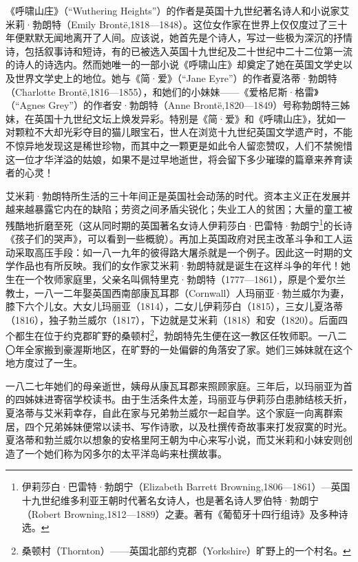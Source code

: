 \par 《呼啸山庄》（“Wuthering Heights”）的作者是英国十九世纪著名诗人和小说家艾米莉·勃朗特（Emily Brontë,1818—1848）。这位女作家在世界上仅仅度过了三十年便默默无闻地离开了人间。应该说，她首先是个诗人，写过一些极为深沉的抒情诗，包括叙事诗和短诗，有的已被选入英国十九世纪及二十世纪中二十二位第一流的诗人的诗选内。然而她唯一的一部小说《呼啸山庄》却奠定了她在英国文学史以及世界文学史上的地位。她与《简·爱》（“Jane Eyre”）的作者夏洛蒂·勃朗特（Charlotte Brontë,1816—1855），和她们的小妹妹——《爱格尼斯·格雷》（“Agnes Grey”）的作者安·勃朗特（Anne Brontë,1820—1849）号称勃朗特三姊妹，在英国十九世纪文坛上焕发异彩。特别是《简·爱》和《呼啸山庄》，犹如一对颗粒不大却光彩夺目的猫儿眼宝石，世人在浏览十九世纪英国文学遗产时，不能不惊异地发现这是稀世珍物，而其中之一颗更是如此令人留恋赞叹，人们不禁惋惜这一位才华洋溢的姑娘，如果不是过早地逝世，将会留下多少璀璨的篇章来养育读者的心灵！
\par 艾米莉·勃朗特所生活的三十年间正是英国社会动荡的时代。资本主义正在发展并越来越暴露它内在的缺陷；劳资之间矛盾尖锐化；失业工人的贫困；大量的童工被残酷地折磨至死（这从同时期的英国著名女诗人伊莉莎白·巴雷特·勃朗宁\footnote{伊莉莎白·巴雷特·勃朗宁（Elizabeth Barrett Browning,1806—1861）—英国十九世纪维多利亚王朝时代著名女诗人，也是著名诗人罗伯特·勃朗宁（Robert Browning,1812—1889）之妻。著有《葡萄牙十四行组诗》及多种诗选。}的长诗《孩子们的哭声》，可以看到一些概貌）。再加上英国政府对民主改革斗争和工人运动采取高压手段：如一八一九年的彼得路大屠杀就是一个例子。因此这一时期的文学作品也有所反映。我们的女作家艾米莉·勃朗特就是诞生在这样斗争的年代！她生在一个牧师家庭里，父亲名叫佩特里克·勃朗特（1777—1861），原是个爱尔兰教士，一八一二年娶英国西南部康瓦耳郡（Cornwall）人玛丽亚·勃兰威尔为妻，膝下六个儿女。大女儿玛丽亚（1814），二女儿伊莉莎白（1815），三女儿夏洛蒂（1816），独子勃兰威尔（1817），下边就是艾米莉（1818）和安（1820）。后面四个都生在位于约克郡旷野的桑顿村\footnote{桑顿村（Thornton）——英国北部约克郡（Yorkshire）旷野上的一个村名。}，勃朗特先生便在这一教区任牧师职。一八二〇年全家搬到豪渥斯地区，在旷野的一处偏僻的角落安了家。她们三姊妹就在这个地方度过了一生。
\par 一八二七年她们的母亲逝世，姨母从康瓦耳郡来照顾家庭。三年后，以玛丽亚为首的四姊妹进寄宿学校读书。由于生活条件太差，玛丽亚与伊莉莎白患肺结核夭折，夏洛蒂与艾米莉幸存，自此在家与兄弟勃兰威尔一起自学。这个家庭一向离群索居，四个兄弟姊妹便常以读书、写作诗歌，以及杜撰传奇故事来打发寂寞的时光。夏洛蒂和勃兰威尔以想象的安格里阿王朝为中心来写小说，而艾米莉和小妹安则创造了一个她们称为冈多尔的太平洋岛屿来杜撰故事。
